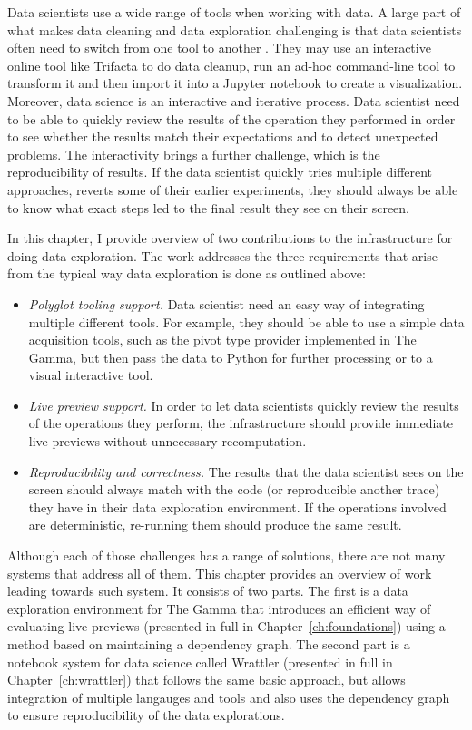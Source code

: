 \documentclass[fleqn,11pt]{report}
\theoremstyle{definition}
\newenvironment{nitemize}
{ \vspace{-0.4em}
  \begin{itemize}
    \setlength{\itemsep}{5pt}
    \setlength{\parskip}{0pt}
    \setlength{\parsep}{0pt} }
{ \end{itemize}
  \vspace{-0.4em} }
\begin{document}
Data scientists use a wide range of tools when working with data. A large part of what makes
data cleaning and data exploration challenging is that data scientists often need to switch
from one tool to another \citep{rattenbury-2017-wrangling}. They may use an interactive online
tool like Trifacta to do data cleanup, run an ad-hoc command-line tool to
transform it and then import it into a Jupyter notebook to create a visualization. Moreover,
data science is an interactive and iterative process. Data scientist need to be able to quickly
review the results of the operation they performed in order to see whether the results match
their expectations and to detect unexpected problems. The interactivity brings a further challenge,
which is the reproducibility of results. If the data scientist quickly tries multiple different
approaches, reverts some of their earlier experiments, they should always be able to know what
exact steps led to the final result they see on their screen.

In this chapter, I provide overview of two contributions to the infrastructure for doing data
exploration. The work addresses the three requirements that arise from the typical way data
exploration is done as outlined above:

\begin{nitemize}
\item \emph{Polyglot tooling support.} Data scientist need an easy way of integrating multiple
  different tools. For example, they should be able to use a simple data acquisition tools,
  such as the pivot type provider implemented in The Gamma, but then pass the data to Python
  for further processing or to a visual interactive tool.

\item \emph{Live preview support.} In order to let data scientists quickly review the results
  of the operations they perform, the infrastructure should provide immediate live previews
  without unnecessary recomputation.

\item \emph{Reproducibility and correctness.} The results that the data scientist sees on the
  screen should always match with the code (or reproducible another trace) they have in their
  data exploration environment. If the operations involved are deterministic, re-running them
  should produce the same result.
\end{nitemize}

Although each of those challenges has a range of solutions, there are not many systems that
address all of them. This chapter provides an overview of work leading towards such system.
It consists of two parts. The first is a data exploration environment for The Gamma that introduces
an efficient way of evaluating live previews (presented in full in Chapter~\ref{ch:foundations})
using a method based on maintaining a dependency graph. The second part is a notebook system for
data science called Wrattler (presented in full in Chapter~\ref{ch:wrattler}) that
follows the same basic approach, but allows integration of multiple langauges and tools and also
uses the dependency graph to ensure reproducibility of the data explorations.
\end{document}
